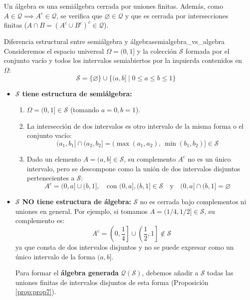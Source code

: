 \begin{observacion}
Un álgebra es una semiálgebra cerrada por uniones finitas. Además, como $A \in \mathcal{Q} \implies A^c \in \mathcal{Q}$, se verifica que $\varnothing \in \mathcal{Q}$ y que es cerrada por intersecciones finitas ($A \cap B = (A^c \cup B^c)^c \in \mathcal{Q}$).
\end{observacion}

\begin{ejemplo}{Diferencia estructural entre semiálgebra y álgebra}{semialgebra_vs_algebra}
Consideremos el espacio universal $\Omega = (0, 1]$ y la colección $\mathcal{S}$ formada por el conjunto vacío y todos los intervalos semiabiertos por la izquierda contenidos en $\Omega$:
\[
    \mathcal{S} = \{ \varnothing \} \cup \{ (a, b] \mid 0 \le a \le b \le 1 \}
\]

\begin{itemize}
    \item \textbf{$\mathcal{S}$ tiene estructura de semiálgebra:}
    \begin{enumerate}
        \item $\Omega = (0, 1] \in \mathcal{S}$ (tomando $a=0, b=1$).
        \item La intersección de dos intervalos es otro intervalo de la misma forma o el conjunto vacío:
        \[
            (a_1, b_1] \cap (a_2, b_2] = (\max(a_1, a_2), \, \min(b_1, b_2)] \in \mathcal{S}
        \]
        \item Dado un elemento $A = (a, b] \in \mathcal{S}$, su complemento $A^c$ no es un único intervalo, pero se descompone como la unión de dos intervalos disjuntos pertenecientes a $\mathcal{S}$:
        \[
            A^c = (0, a] \cup (b, 1], \quad \text{con } (0, a], (b, 1] \in \mathcal{S} \quad \text{y} \quad (0, a] \cap (b, 1] = \varnothing
        \]
    \end{enumerate}

    \item \textbf{$\mathcal{S}$ NO tiene estructura de álgebra:}
    $\mathcal{S}$ no es cerrada bajo complementos ni uniones en general. Por ejemplo, si tomamos $A = (1/4, 1/2] \in \mathcal{S}$, su complemento es:
    \[
        A^c = \left(0, \frac{1}{4}\right] \cup \left(\frac{1}{2}, 1\right] \notin \mathcal{S}
    \]
    ya que consta de dos intervalos disjuntos y no se puede expresar como un único intervalo de la forma $(a, b]$. 

    Para formar el \textbf{álgebra generada} $\mathcal{Q}(\mathcal{S})$, debemos añadir a $\mathcal{S}$ todas las uniones finitas de intervalos disjuntos de esta forma (Proposición \ref{prop:prop7}).
\end{itemize}
\end{ejemplo}

